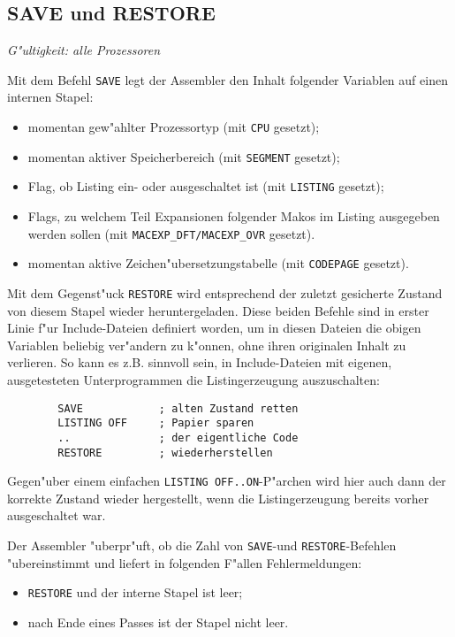 \documentclass[12pt,a4paper,twoside]{report}
\makeatletter
\newcommand{\tty}[1]{{\tt #1}}
\newcommand{\ttindex}[1]{\index{#1@{\tt #1}}}
\makeatother
\begin{document}
\subsection{SAVE und RESTORE}
\ttindex{SAVE}\ttindex{RESTORE}

{\em G"ultigkeit: alle Prozessoren}

Mit dem Befehl \tty{SAVE} legt der Assembler den Inhalt folgender
Variablen auf einen internen Stapel:
\begin{itemize}
\item{momentan gew"ahlter Prozessortyp (mit \tty{CPU} gesetzt);}
\item{momentan aktiver Speicherbereich (mit \tty{SEGMENT} gesetzt);}
\item{Flag, ob Listing ein- oder ausgeschaltet ist (mit \tty{LISTING}
      gesetzt);}
\item{Flags, zu welchem Teil Expansionen folgender Makos im Listing
      ausgegeben werden sollen (mit \tty{MACEXP\_DFT/MACEXP\_OVR}
      gesetzt).}
\item{momentan aktive Zeichen"ubersetzungstabelle (mit \tty{CODEPAGE}
      gesetzt).}
\end{itemize}
Mit dem Gegenst"uck \tty{RESTORE} wird entsprechend der zuletzt
gesicherte Zustand von diesem Stapel wieder heruntergeladen.  Diese beiden
Befehle sind in erster Linie f"ur Include-Dateien definiert worden, um
in diesen Dateien die obigen Variablen beliebig ver"andern zu k"onnen,
ohne ihren originalen Inhalt zu verlieren.  So kann es z.B. sinnvoll sein,
in Include-Dateien mit eigenen, ausgetesteten Unterprogrammen die
Listingerzeugung auszuschalten:
\begin{verbatim}
        SAVE            ; alten Zustand retten
        LISTING OFF     ; Papier sparen
        ..              ; der eigentliche Code
        RESTORE         ; wiederherstellen
\end{verbatim}
Gegen"uber einem einfachen \tty{LISTING OFF..ON}-P"archen wird hier
auch dann der korrekte Zustand wieder hergestellt, wenn die Listingerzeugung
bereits vorher ausgeschaltet war.
\par
Der Assembler "uberpr"uft, ob die Zahl von \tty{SAVE}-und \tty{RESTORE}-Befehlen
"ubereinstimmt und liefert in folgenden F"allen Fehlermeldungen:
\begin{itemize}
\item{\tty{RESTORE} und der interne Stapel ist leer;}
\item{nach Ende eines Passes ist der Stapel nicht leer.}
\end{itemize}
\end{document}
